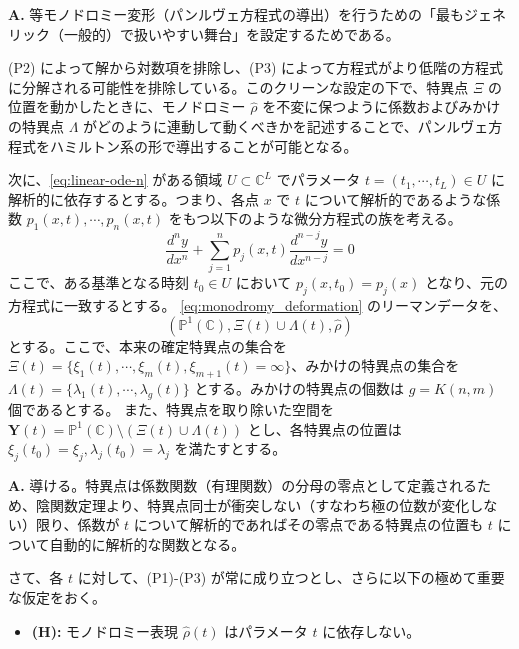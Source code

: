 \begin{Q}
\textbf{A.} 等モノドロミー変形（パンルヴェ方程式の導出）を行うための「最もジェネリック（一般的）で扱いやすい舞台」を設定するためである。

(P2) によって解から対数項を排除し、(P3) によって方程式がより低階の方程式に分解される可能性を排除している。このクリーンな設定の下で、特異点 $\Xi$ の位置を動かしたときに、モノドロミー $\hat{\rho}$ を不変に保つように係数およびみかけの特異点 $\Lambda$ がどのように連動して動くべきかを記述することで、パンルヴェ方程式をハミルトン系の形で導出することが可能となる。
\end{Q}
次に、\eqref{eq:linear-ode-n} がある領域 $U \subset \mathbb{C}^{L}$ でパラメータ $t=(t_{1},\cdots,t_{L})\in U$ に解析的に依存するとする。つまり、各点 $x$ で $t$ について解析的であるような係数 $p_{1}(x,t),\cdots,p_{n}(x,t)$ をもつ以下のような微分方程式の族を考える。
\begin{equation}\label{eq:monodromy_deformation}
\frac{d^{n}y}{dx^{n}}+\sum_{j=1}^{n} p_{j}(x,t)\frac{d^{n-j}y}{dx^{n-j}} = 0   
\end{equation}
ここで、ある基準となる時刻 $t_{0}\in U$ において $p_{j}(x,t_{0})=p_{j}(x)$ となり、元の方程式に一致するとする。
\eqref{eq:monodromy_deformation} のリーマンデータを、
\[
(\mathbb{P}^{1}(\mathbb{C}),\Xi(t)\cup\Lambda(t),\hat{\rho})
\]
とする。ここで、本来の確定特異点の集合を $\Xi(t)=\{\xi_{1}(t),\cdots,\xi_{m}(t),\xi_{m+1}(t)=\infty\}$、みかけの特異点の集合を $\Lambda(t)=\{\lambda_{1}(t),\cdots,\lambda_{g}(t)\}$ とする。みかけの特異点の個数は $g=K(n,m)$ 個であるとする。
また、特異点を取り除いた空間を $\mathbf{Y}(t)=\mathbb{P}^{1}(\mathbb{C})\setminus(\Xi(t)\cup\Lambda(t))$ とし、各特異点の位置は $\xi_{j}(t_{0})=\xi_{j}, \lambda_{j}(t_{0})=\lambda_{j}$ を満たすとする。

\begin{Q}
\textbf{A.} 導ける。特異点は係数関数（有理関数）の分母の零点として定義されるため、陰関数定理より、特異点同士が衝突しない（すなわち極の位数が変化しない）限り、係数が $t$ について解析的であればその零点である特異点の位置も $t$ について自動的に解析的な関数となる。
\end{Q}

さて、各 $t$ に対して、(P1)-(P3) が常に成り立つとし、さらに以下の極めて重要な仮定をおく。
\begin{itemize}
    \item[] \textbf{(H):} モノドロミー表現 $\hat{\rho}(t)$ はパラメータ $t$ に依存しない。
\end{itemize}

